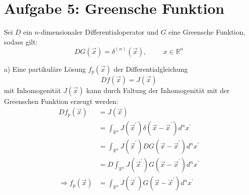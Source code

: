 \documentclass[11pt a4paper]{article}
\begin{document}
\section*{Aufgabe 5: Greensche Funktion}
Sei $D$ ein $n$-dimensionaler Differentialoperator und $G$ eine Greensche Funktion, sodass 
gilt:
\[
	DG(\vec x) = \delta^{(n)}(\vec x), \hspace{1cm} x \in \mathbb{R}^n
\]
\par{a)} Eine partikuläre Lösung $f_p(\vec x)$ der Differentialgleichung
\[
	Df(\vec x) = J(\vec x)
\]
mit Inhomogenität $J(\vec x)$ kann durch Faltung der Inhomogenität mit der
Greenschen Funktion erzeugt werden:
\begin{align*}
	D f_p(\vec x) 
	&= J(\vec x) \\
	&= \int_{\mathbb{R}^n} J(\vec x^\prime)
	\delta(\vec x - \vec x^\prime) d^nx^\prime \\
	&= \int_{\mathbb{R}^n} J(\vec x^\prime) 
	DG(\vec x - \vec x^\prime) d^nx^\prime \\
	&= D \int_{\mathbb{R}^n} J(\vec x^\prime)
	G(\vec x - \vec x^\prime) d^nx^\prime \\
	\Rightarrow
	f_p(\vec x) 
	&=  \int_{\mathbb{R}^n} J(\vec x^\prime)
	G(\vec x - \vec x^\prime) d^nx^\prime
\end{align*}
	
\end{document}
